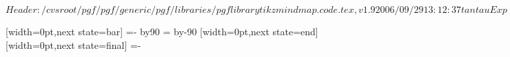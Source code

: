 \ProvidesPackageRCS[v\pgfversion] $Header: /cvsroot/pgf/pgf/generic/pgf/libraries/pgflibrarytikzmindmap.code.tex,v 1.9 2006/09/29 13:12:37 tantau Exp $

%




%

{
  [width=0pt,next state=bar]
  {
    {
    \pgftransformxshift{-\pgfsnakecirclestartradius}%
    \pgfpathmoveto{\pgfpointpolar{\pgfsnakesegmentangle}{\pgfsnakecirclestartradius}}
    \pgfpatharc{\pgfsnakesegmentangle}{-\pgfsnakesegmentangle}{\pgfsnakecirclestartradius}
    \@tempcnta=-\pgfsnakesegmentangle\relax
    \advance\@tempcnta by90\relax
    \setlength\@tempdima{\pgfsnakecirclestartradius}
    \setlength\@tempdimb{\pgfsnakesegmentamplitude}
    \pgfpathcurveto
    {\pgfpointadd
      {\pgfpointpolar{-\pgfsnakesegmentangle}{\pgfsnakecirclestartradius}}
      {}}
    {}
    {}
    \@tempcnta=\pgfsnakesegmentangle\relax
    \advance\@tempcnta by-90\relax
    \pgfpathcurveto
    {}
    {\pgfpointadd
      {\pgfpointpolar{\pgfsnakesegmentangle}{\pgfsnakecirclestartradius}}
      {}}
    {\pgfpointpolar{\pgfsnakesegmentangle}{\pgfsnakecirclestartradius}}
    \pgfpathclose
    }
  }
  [width=0pt,next state=end]
  {
    \setlength\@tempdima{\pgfsnakecirclestartradius}%
    \setlength\@tempdimb{\pgfsnakecircleendradius}%
    \setlength\pgf@xc{\pgfsnakesegmentamplitude}%
    \pgfpathrectangle
    {}
    {}
  }
  [width=0pt,next state=final]
  {
    {
    \pgftransformxshift{\pgfsnakeremainingdistance}%
    \pgftransformxshift{-\pgfsnakecircleendradius}%
    \pgfpathmoveto{\pgfpointpolar{\pgfsnakesegmentangle}{\pgfsnakecircleendradius}}
    \pgfpatharc{\pgfsnakesegmentangle}{-\pgfsnakesegmentangle}{\pgfsnakecircleendradius}
    \@tempcnta=-\pgfsnakesegmentangle\relax
}}}
